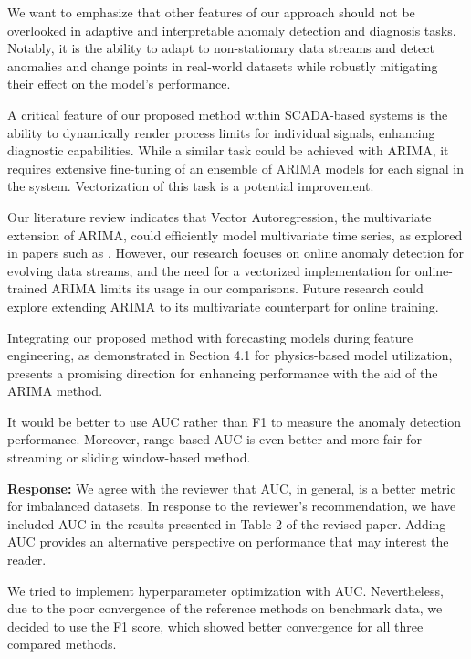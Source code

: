 \documentclass{article}
\makeatletter
\newenvironment{comment}{
\begin{sloppypar}\slshape
\vspace{5 mm}
\color{blue}
 \@beginparpenalty\@M
  \begin{list}{}{\setlength{\topsep}{0ex}%
  \setlength{\leftmargin}{\rightmargin}}\item[]
 \@beginparpenalty\@endparpenalty
}
{\end{list}
\end{sloppypar}
}
\makeatother
\begin{document}
\begin{enumerate}
        We want to emphasize that other features of our approach should not be overlooked in adaptive and interpretable anomaly detection and diagnosis tasks. Notably, it is the ability to adapt to non-stationary data streams and detect anomalies and change points in real-world datasets while robustly mitigating their effect on the model's performance.

        A critical feature of our proposed method within SCADA-based systems is the ability to dynamically render process limits for individual signals, enhancing diagnostic capabilities. While a similar task could be achieved with ARIMA, it requires extensive fine-tuning of an ensemble of ARIMA models for each signal in the system. Vectorization of this task is a potential improvement.

        Our literature review indicates that Vector Autoregression, the multivariate extension of ARIMA, could efficiently model multivariate time series, as explored in papers such as \cite{Melnyk2016, Zhang2023}. However, our research focuses on online anomaly detection for evolving data streams, and the need for a vectorized implementation for online-trained ARIMA limits its usage in our comparisons. Future research could explore extending ARIMA to its multivariate counterpart for online training.

        Integrating our proposed method with forecasting models during feature engineering, as demonstrated in Section 4.1 for physics-based model utilization, presents a promising direction for enhancing performance with the aid of the ARIMA method.

  \item
        \begin{comment}
        It would be better to use AUC rather than F1 to measure the anomaly detection performance. Moreover, range-based AUC is even better and more fair for streaming or sliding window-based method.
        \end{comment}
        {\bf Response:}
        We agree with the reviewer that AUC, in general, is a better metric for imbalanced datasets. In response to the reviewer's recommendation, we have included AUC in the results presented in Table 2 of the revised paper. Adding AUC provides an alternative perspective on performance that may interest the reader.

        We tried to implement hyperparameter optimization with AUC. Nevertheless, due to the poor convergence of the reference methods on benchmark data, we decided to use the F1 score, which showed better convergence for all three compared methods.


\end{enumerate}
\end{document}
